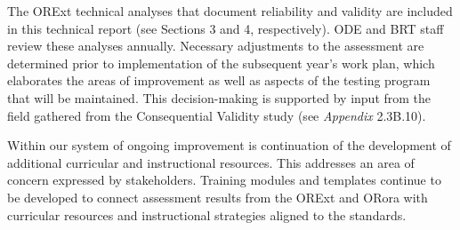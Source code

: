 \documentclass[]{article}
\begin{document}
The ORExt technical analyses that document reliability and validity are
included in this technical report (see Sections 3 and 4, respectively).
ODE and BRT staff review these analyses annually. Necessary adjustments
to the assessment are determined prior to implementation of the
subsequent year's work plan, which elaborates the areas of improvement
as well as aspects of the testing program that will be maintained. This
decision-making is supported by input from the field gathered from the
Consequential Validity study (see \emph{Appendix} 2.3B.10).

Within our system of ongoing improvement is continuation of the
development of additional curricular and instructional resources. This
addresses an area of concern expressed by stakeholders. Training modules
and templates continue to be developed to connect assessment results
from the ORExt and ORora with curricular resources and instructional
strategies aligned to the standards.
\end{document}
